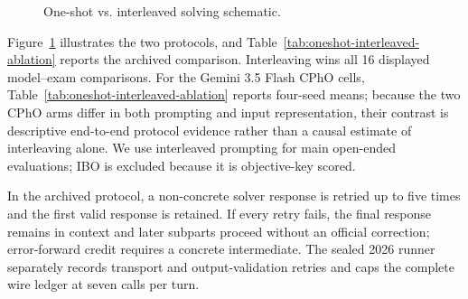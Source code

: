 \documentclass[11pt]{article}
\begin{document}
\begin{figure}[t]
\setlength{\abovecaptionskip}{0.1cm}
\centering
{}
\caption{One-shot vs. interleaved solving schematic.}
\label{fig:one-shot-vs-iterative}
\vspace{-0.3cm}
\end{figure}

Figure~\ref{fig:one-shot-vs-iterative} illustrates the two protocols, and Table~\ref{tab:oneshot-interleaved-ablation} reports the archived comparison.
Interleaving wins all 16 displayed model--exam comparisons.
For the Gemini 3.5 Flash CPhO cells, Table~\ref{tab:oneshot-interleaved-ablation} reports four-seed means; because the two CPhO arms differ in both prompting and input representation, their contrast is descriptive end-to-end protocol evidence rather than a causal estimate of interleaving alone.
We use interleaved prompting for main open-ended evaluations; IBO is excluded because it is objective-key scored.

In the archived protocol, a non-concrete solver response is retried up to five times and the first valid response is retained. If every retry fails, the final response remains in context and later subparts proceed without an official correction; error-forward credit requires a concrete intermediate. The sealed 2026 runner separately records transport and output-validation retries and caps the complete wire ledger at seven calls per turn.
\end{document}
